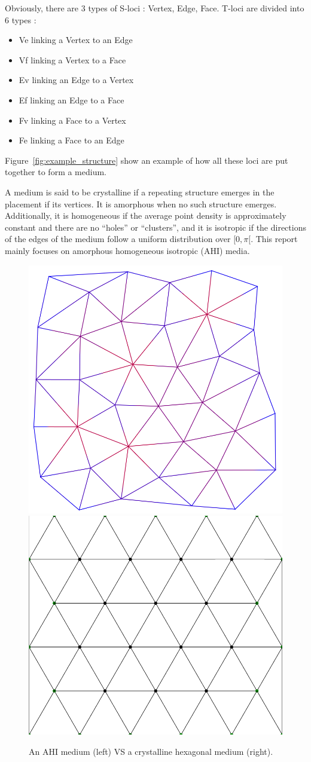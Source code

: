 \documentclass{article}
\begin{document}
Obviously, there are 3 types of S-loci : Vertex, Edge, Face. T-loci are divided into 6 types : 
\begin{itemize}[noitemsep,nosep]
	\item Ve linking a  Vertex to an Edge
	\item Vf linking a  Vertex to a  Face
	\item Ev linking an Edge   to a  Vertex
	\item Ef linking an Edge   to a  Face
	\item Fv linking a  Face   to a  Vertex
	\item Fe linking a  Face   to an Edge
\end{itemize}
Figure~\ref{fig:example_structure} show an example of how all these loci are put together to form a medium.

A medium is said to be crystalline if a repeating structure emerges in the placement if its vertices. It is amorphous when no such structure emerges. Additionally, it is homogeneous if the average point density is approximately constant and there are no
“holes” or “clusters”, and it is isotropic if the directions of the edges of the medium follow a uniform distribution over $[0, \pi[$. This report mainly focuses on amorphous homogeneous isotropic (AHI) media.

\begin{figure}[H]
	\centering\includegraphics[width=0.4\linewidth]{assets/amorphous_medium.png}
	\hspace{0.1\linewidth}
	\centering\includegraphics[width=0.4\linewidth]{assets/hexagonal_medium.png}
	\caption{An AHI medium (left) VS a crystalline hexagonal medium (right).}
	\label{fig:amorphous_vs_crystaline}
\end{figure}
\end{document}
